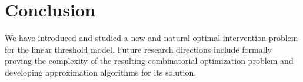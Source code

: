 \documentclass[12pt,twoside,reqno]{amsart}
\theoremstyle{definition}
\numberwithin{equation}{section}
\newcommand{\0}{\mathbf{0}}
\newcommand{\1}{\mathbf{1}}
\begin{document}
\section{Conclusion}
We have introduced and studied a new and natural optimal intervention problem for the linear threshold model. Future research directions include formally proving the complexity of the resulting combinatorial optimization problem and developing approximation algorithms for its solution. 


\noindent
\end{document}
